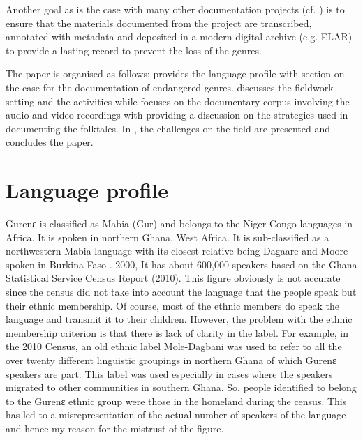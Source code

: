 \documentclass[output=paper,colorlinks,citecolor=brown]{langscibook}
\begin{document}
Another goal as is the case with many other documentation projects (cf. \citealt{TrilsbeekWittenburg2006, Austin2003, Austin2006, Himmelmann1998, HimmelmannEtAl2006}) is to ensure that the materials documented from the project are transcribed, annotated with metadata and deposited in a modern digital archive (e.g. ELAR) to provide a lasting record to prevent the loss of the genres. 

The paper is organised as follows;  provides the language profile with section  on the case for the documentation of endangered genres.  discusses the fieldwork setting and the activities while  focuses on the documentary corpus involving the audio and video recordings with  providing a discussion on the strategies used in documenting the folktales. In , the challenges on the field are presented and  concludes the paper. 

\section{Language profile}\label{sec:atintono:2}
Gurenɛ is classified as Mabia (Gur) and belongs to the Niger Congo languages in Africa. It is spoken in northern Ghana, West Africa. It is sub-classified as a northwestern Mabia language with its closest relative being Dagaare and Moore spoken in Burkina Faso \citep{Naden1989, Bendor-SamuelHartell1989, Bodomo1994, Bodomo2004, Bodomo2020}.  2000,  It has about 600,000 speakers based on the Ghana Statistical Service Census Report (2010). This figure obviously is not accurate since the census did not take into account the language that the people speak but their ethnic membership. Of course, most of the ethnic members do speak the language and transmit it to their children. However, the problem with the ethnic membership criterion is that there is lack of clarity in the label. For example, in the 2010 Census, an old ethnic label Mole-Dagbani was used to refer to all the over twenty different linguistic groupings in northern Ghana of which Gurenɛ speakers are part. This label was used especially in cases where the speakers migrated to other communities in southern Ghana. So, people identified to belong to the Gurenɛ ethnic group were those in the homeland during the census. This has led to a misrepresentation of the actual number of speakers of the language and hence my reason for the mistrust of the figure.
\end{document}
